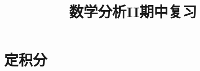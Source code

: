 \everymath{\displaystyle}



\title[数分II\\
期中复习]{\texorpdfstring{\Huge \bfseries 数学分析II期中复习}{数学分析II期中复习}} %
\date{}





\begin{frame}

\titlepage %

\end{frame}




\section{定积分}

